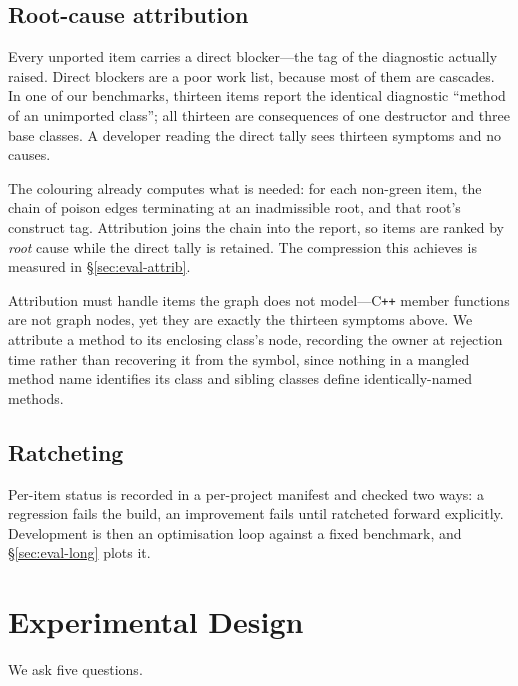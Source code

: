 \documentclass[10pt,twocolumn]{article}
\begin{document}
\subsection{Root-cause attribution}

Every unported item carries a direct blocker---the tag of the diagnostic
actually raised. Direct blockers are a poor work list, because most of them
are cascades. In one of our benchmarks, thirteen items report the identical
diagnostic ``method of an unimported class''; all thirteen are consequences of
one destructor and three base classes. A developer reading the direct tally
sees thirteen symptoms and no causes.

The colouring already computes what is needed: for each non-green item, the
chain of poison edges terminating at an inadmissible root, and that root's
construct tag. Attribution joins the chain into the report, so items are
ranked by \emph{root} cause while the direct tally is retained. The
compression this achieves is measured in \S\ref{sec:eval-attrib}.

Attribution must handle items the graph does not model---C\texttt{++} member
functions are not graph nodes, yet they are exactly the thirteen symptoms
above. We attribute a method to its enclosing class's node, recording the
owner at rejection time rather than recovering it from the symbol, since
nothing in a mangled method name identifies its class and sibling classes
define identically-named methods.

\subsection{Ratcheting}

Per-item status is recorded in a per-project manifest and checked two ways: a
regression fails the build, an improvement fails until ratcheted forward
explicitly. Development is then an optimisation loop against a fixed
benchmark, and \S\ref{sec:eval-long} plots it.

\section{Experimental Design}
\label{sec:expdesign}

We ask five questions.
\end{document}

